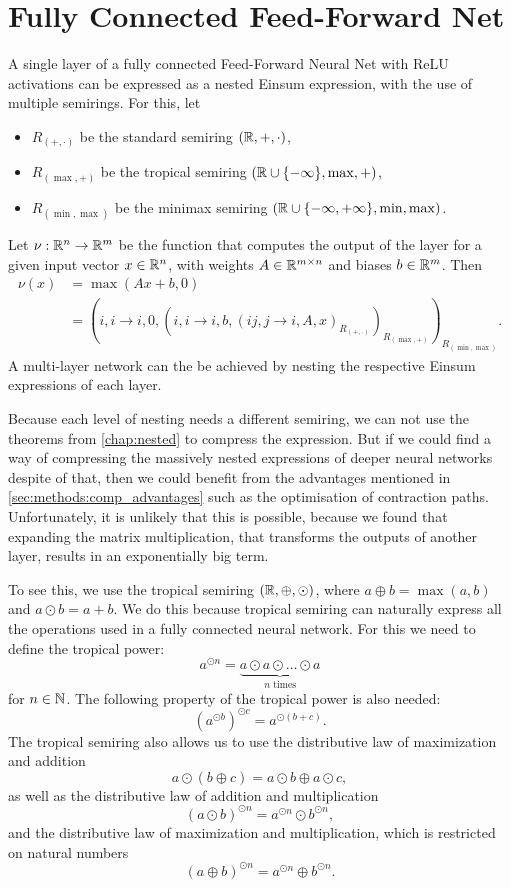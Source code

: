 \section{Fully Connected Feed-Forward Net}
A single layer of a fully connected Feed-Forward Neural Net with ReLU activations can be expressed as a nested Einsum expression, with the use of multiple semirings.
For this, let
\begin{itemize}
    \item $R_{(+, \cdot)}$ be the standard semiring $(\mathbb{R}, +, \cdot)$,
    \item $R_{(\max, +)}$ be the tropical semiring $(\mathbb{R} \cup \lbrace -\infty \rbrace, \max, +)$,
    \item $R_{(\min, \max)}$ be the minimax semiring $(\mathbb{R} \cup \lbrace -\infty, +\infty \rbrace, \min, \max)$.
\end{itemize}
Let $\nu: \mathbb{R}^n \rightarrow \mathbb{R}^m$ be the function that computes the output of the layer for a given input vector $x \in \mathbb{R}^n$, with weights $A \in \mathbb{R}^{m \times n}$ and biases $b \in \mathbb{R}^m$.
Then
\begin{align*}
    \nu(x) & = \max(Ax + b, 0)                                                                                                                   \\
           & = (i,i\rightarrow i, 0, (i,i \rightarrow i, b, (ij, j \rightarrow i, A, x)_{R_{(+, \cdot)}} )_{R_{(\max, +)}} )_{R_{(\min, \max)}}.
\end{align*}
A multi-layer network can the be achieved by nesting the respective Einsum expressions of each layer.

Because each level of nesting needs a different semiring, we can not use the theorems from \autoref{chap:nested} to compress the expression.
But if we could find a way of compressing the massively nested expressions of deeper neural networks despite of that, then we could benefit from the advantages mentioned in \autoref{sec:methods:comp_advantages} such as the optimisation of contraction paths.
Unfortunately, it is unlikely that this is possible, because we found that expanding the matrix multiplication, that transforms the outputs of another layer, results in an exponentially big term.

To see this, we use the tropical semiring $(\mathbb{R}, \oplus, \odot)$, where $a \oplus b = \max(a,b)$ and $a \odot b = a + b$.
We do this because tropical semiring can naturally express all the operations used in a fully connected neural network.
For this we need to define the tropical power:
$$a^{\odot n} = \underbrace{a \odot a \odot \ldots \odot a}_{n \text{ times}}$$
for $n \in \mathbb{N}$. The following property of the tropical power is also needed:
$$\left(a^{\odot b}\right)^{\odot c} = a^{\odot(b + c)}.$$
The tropical semiring also allows us to use the distributive law of maximization and addition
$$a \odot (b \oplus c) = a \odot b \oplus a \odot c,$$
as well as the distributive law of addition and multiplication
$$(a \odot b)^{\odot n} = a^{\odot n} \odot b^{\odot n},$$
and the distributive law of maximization and multiplication, which is restricted on natural numbers
$$(a \oplus b)^{\odot n} = a^{\odot n} \oplus b^{\odot n}.$$

